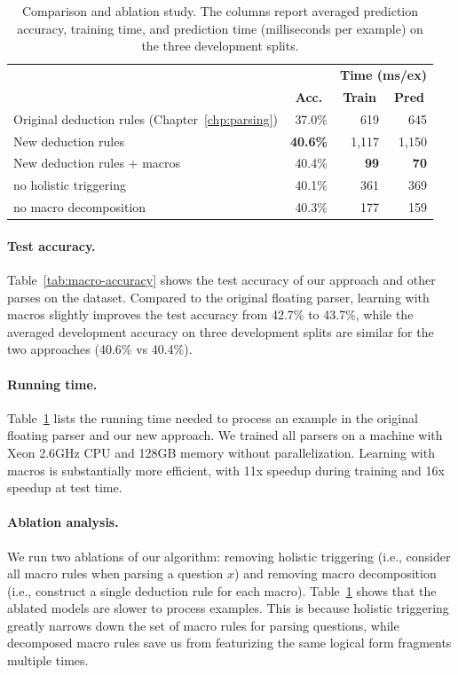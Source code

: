 \newcommand{\midhead}[1]{\multicolumn{1}{c}{\textbf{#1}}}
\begin{table}[t]
\centering
\begin{tabular}{lrrr}
\toprule
& & \multicolumn{2}{c}{\textbf{Time (ms/ex)}} \\ \cmidrule{3-4}
& \midhead{Acc.} & \midhead{Train} & \midhead{Pred} \\
\midrule
Original deduction rules (Chapter~\ref{chp:parsing})
& 37.0\% & 619 & 645 \\
New deduction rules & \textbf{40.6\%} & 1,117 & 1,150 \\
New deduction rules + macros & 40.4\%  & \textbf{99} & \textbf{70} \\
\quad no holistic triggering & 40.1\% &  361 & 369 \\
\quad no macro decomposition & 40.3\% & 177 & 159 \\
\bottomrule
\end{tabular}
\caption[Running time of macro rules]
{Comparison and ablation study. The columns report averaged prediction accuracy, training time, and prediction time (milliseconds per example) on the three development splits.}\label{tab:macro-time}
\end{table}

\paragraph{Test accuracy.}
Table~\ref{tab:macro-accuracy} shows the test accuracy
of our approach and other parses on the \wtq dataset.
Compared to the original floating parser,
learning with macros slightly improves the test accuracy
from 42.7\% to 43.7\%,
while the averaged development accuracy on three development splits
are similar for the two approaches
(40.6\% vs 40.4\%).

\paragraph{Running time.}
Table~\ref{tab:macro-time} lists the
running time needed to process an example
in the original floating parser
and our new approach.
We trained all parsers on a machine
with Xeon 2.6GHz CPU and 128GB memory without parallelization.
Learning with macros is substantially
more efficient, with 11x speedup during training
and 16x speedup at test time.

\paragraph{Ablation analysis.}
We run two ablations of our algorithm:
removing holistic triggering
(i.e., consider all macro rules when parsing a question $x$)
and removing macro decomposition
(i.e., construct a single deduction rule for each macro).
Table~\ref{tab:macro-time}
shows that the ablated models are slower
to process examples.
This is because holistic triggering
greatly narrows down
the set of macro rules for parsing questions,
while decomposed macro rules
save us from featurizing the same
logical form fragments multiple times.


